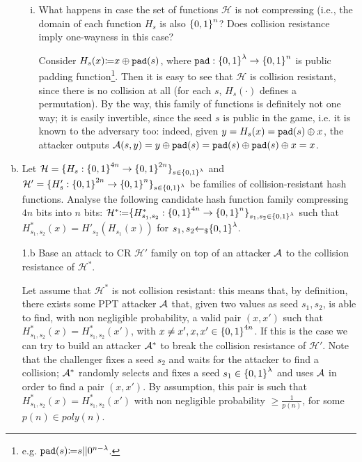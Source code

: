 \begin{enumerate}[(a)]
\begin{enumerate}[(i)]
	\item What happens in case the set of functions $\mathcal{H}$ is not compressing (i.e., the domain of each function $H_s$ is also ${\{0, 1\}}^n$? Does collision resistance imply one-wayness in this case?
	
	\begin{solution}
		Consider $H_s(x) {\coloneqq} x \oplus \texttt{pad}(s)$, where $\texttt{pad}: {\{0, 1\}}^\lambda \to {\{0, 1\}}^n$ is public padding function\footnote{e.g. $\texttt{pad}(s) {\coloneqq} s||0^{n-\lambda}$.}. Then it is easy to see that $\mathcal{H}$ is collision resistant, since there is no collision at all (for each $s$, $H_s(\cdot)$ defines a permutation). By the way, this family of functions is definitely not one way; it is easily invertible, since the seed $s$ is public in the game, i.e. it is known to the adversary too: indeed, given $y = H_s(x) = \texttt{pad}(s) \oplus x$, the attacker outputs $\mathcal{A}(s, y) = y \oplus \texttt{pad}(s) = \texttt{pad}(s) \oplus \texttt{pad}(s) \oplus x = x$.
	\end{solution}
	\end{enumerate}

	\item Let $\mathcal{H} = \{H_s: {\{0, 1\}}^{4n} \to {\{0, 1\}}^{2n}\}_{s \in {\{0, 1\}}^\lambda}$ and  $\mathcal{H}' = \{H'_s: {\{0, 1\}}^{2n} \to {\{0, 1\}}^{n}\}_{s \in {\{0, 1\}}^\lambda}$ be families of collision-resistant hash functions. Analyse the following candidate hash function family compressing $4n$ bits into $n$ bits: $\mathcal{H}^* {\coloneqq} \{H^*_{s_1,s_2}: {\{0, 1\}}^{4n} \to {\{0, 1\}}^n\}_{s_1, s_2 \in {\{0, 1\}}^\lambda}$ such that $H^*_{s_1, s_2}(x) = H'_{s_2}(H_{s_1}(x))$ for $s_1, s_2 {\leftarrow_\$} {\{0, 1\}}^\lambda$.
	
	\begin{solution}
		\begin{cryptoredux}
			{1.b}
			{Base an attack to CR $\mathcal{H}'$ family on top of an attacker $\mathcal{A}$ to the collision resistance of $\mathcal{H}^*$.}
			{}
			{}
			{}
			\cseqdelay
			\cseqdelay
		\end{cryptoredux}
	Let assume that $\mathcal{H}^*$ is not collision resistant: this means that, by definition, there exists some PPT attacker $\mathcal{A}$ that, given two values as seed $s_1, s_2$, is able to find, with non negligible probability, a valid pair $(x, x')$ such that $H_{s_1, s_2}^*(x) = H_{s_1, s_2}^*(x')$, with $x \ne x', x, x' \in {\{0, 1\}}^{4n}$. If this is the case we can try to build an attacker $\mathcal{A}^*$ to break the collision resistance of $\mathcal{H}'$. Note that the challenger fixes a seed $s_2$ and waits for the attacker to find a collision; $\mathcal{A}^*$ randomly selects and fixes a seed $s_1 \in {\{0, 1\}}^\lambda$ and uses $\mathcal{A}$ in order to find a pair $(x, x')$. By assumption, this pair is such that $H^*_{s_1, s_2}(x) = H^*_{s_1, s_2}(x')$ with non negligible probability $\ge \frac{1}{p(n)}$, for some $p(n) \in poly(n)$.


\end{solution}
\end{enumerate}

